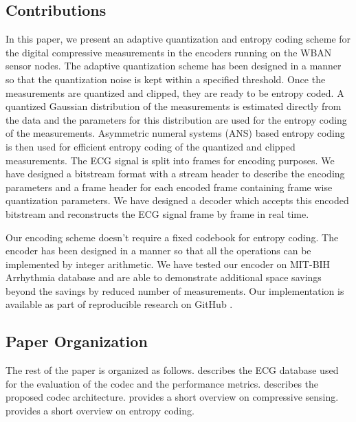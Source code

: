 \subsection{Contributions}
In this paper, we present an adaptive quantization and
entropy coding scheme for the digital compressive measurements
in the encoders running on the WBAN sensor nodes.
The adaptive quantization scheme has been designed in a manner
so that the quantization noise is kept within a specified
threshold. Once the measurements are quantized and clipped,
they are ready to be entropy coded. A quantized Gaussian
distribution of the measurements is estimated directly from
the data and the parameters for this distribution are used
for the entropy coding of the measurements.  
Asymmetric numeral systems (ANS) based
entropy coding is then used for efficient entropy coding
of the quantized and clipped measurements.
The ECG signal is split into frames for encoding purposes.
We have designed a bitstream format with a stream header
to describe the encoding parameters and a frame header
for each encoded frame containing frame wise quantization
parameters. We have designed a decoder which accepts this
encoded bitstream and reconstructs the ECG signal frame by
frame in real time. 

Our encoding scheme doesn't require a fixed codebook
for entropy coding. The encoder has been
designed in a manner so that all the operations can
be implemented by integer arithmetic. We have
tested our encoder on MIT-BIH Arrhythmia database
and are able to demonstrate additional space savings
beyond the savings by reduced number of measurements.
Our implementation is available as part of
reproducible research on GitHub \cite{kumar2022ecgcodec}.

\subsection{Paper Organization}
The rest of the paper is organized as follows.
 describes the ECG database
used for the evaluation of the codec and the
performance metrics.
 describes the proposed codec architecture.
 provides a short overview on
compressive sensing.
 provides a short overview on
entropy coding.


